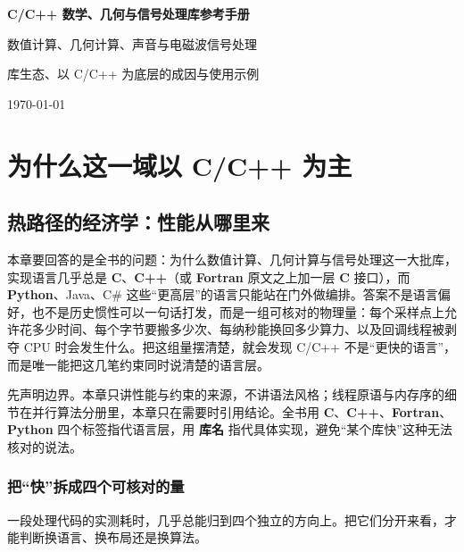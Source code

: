 \documentclass[12pt,a4paper,fontset=fandol]{ctexbook}
\newcommand{\Lib}[1]{\textbf{#1}}
\newcommand{\Lang}[1]{\textsf{\bfseries #1}}
\newcommand{\CL}{\Lang{C}}
\newcommand{\CPP}{\Lang{C++}}
\newcommand{\FTN}{\Lang{Fortran}}
\newcommand{\PY}{\Lang{Python}}
\begin{document}
\frontmatter

\begin{titlepage}
\centering
\vspace*{4cm}
{\Huge\bfseries C/C++ 数学、几何与信号处理库参考手册\par}
\vspace{1cm}
{\LARGE 数值计算、几何计算、声音与电磁波信号处理\par}
\vspace{0.4cm}
{\Large 库生态、以 C/C++ 为底层的成因与使用示例\par}
\vfill
{\large \today\par}
\end{titlepage}

\tableofcontents

\mainmatter

\cleardoublepage

\part{为什么这一域以 C/C++ 为主}

\chapter{热路径的经济学：性能从哪里来}

本章要回答的是全书的问题：为什么数值计算、几何计算与信号处理这一大批库，实现语言几乎总是 \CL{}、\CPP{}（或 \FTN{} 原文之上加一层 \CL{} 接口），而 \PY{}、Java、C\# 这些``更高层''的语言只能站在门外做编排。答案不是语言偏好，也不是历史惯性可以一句话打发，而是一组可核对的物理量：每个采样点上允许花多少时间、每个字节要搬多少次、每纳秒能换回多少算力、以及回调线程被剥夺 CPU 时会发生什么。把这组量摆清楚，就会发现 C/C++ 不是``更快的语言''，而是唯一能把这几笔约束同时说清楚的语言层。

先声明边界。本章只讲性能与约束的来源，不讲语法风格；线程原语与内存序的细节在并行算法分册里，本章只在需要时引用结论。全书用 \CL、\CPP、\FTN、\PY{} 四个标签指代语言层，用 \Lib{库名} 指代具体实现，避免``某个库快''这种无法核对的说法。

\section{把``快''拆成四个可核对的量}

一段处理代码的实测耗时，几乎总能归到四个独立的方向上。把它们分开来看，才能判断换语言、换布局还是换算法。
\end{document}
